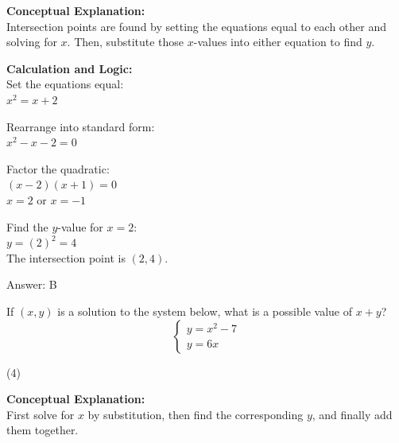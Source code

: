 \documentclass[11pt,paper=a4,answers]{exam}
\begin{document}
\begin{questions}
\begin{solution}
\textbf{Conceptual Explanation:} \\
Intersection points are found by setting the equations equal to each other and solving for $x$. Then, substitute those $x$-values into either equation to find $y$.

\vspace{20pt}

\textbf{Calculation and Logic:} \\
Set the equations equal: \\
$x^2 = x + 2$

\vspace{10pt}

Rearrange into standard form: \\
$x^2 - x - 2 = 0$

\vspace{10pt}

Factor the quadratic: \\
$(x - 2)(x + 1) = 0$ \\
$x = 2$ or $x = -1$

\vspace{10pt}

Find the $y$-value for $x = 2$: \\
$y = (2)^2 = 4$ \\
The intersection point is $(2, 4)$.

\vspace{25pt}

Answer: \colorbox{yellow!100}{B}
\end{solution}

\vspace{40pt}

\question
If $(x, y)$ is a solution to the system below, what is a possible value of $x + y$?
\[ \begin{cases} y = x^2 - 7 \\ y = 6x \end{cases} \]
\begin{tasks}(4)
\end{tasks}

\begin{solution}
\textbf{Conceptual Explanation:} \\
First solve for $x$ by substitution, then find the corresponding $y$, and finally add them together.

\vspace{20pt}


\end{solution}
\end{questions}
\end{document}
